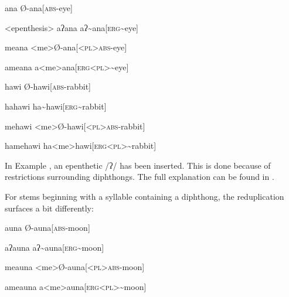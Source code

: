 \begin{paracol}{2}
\a
\begingl
\glpreamble ana
\endpreamble
Ø-ana[\textsc{abs-}eye]
\endgl
\switchcolumn

\a<epenthesis>
\begingl
\glpreamble aʔana
\endpreamble
aʔ\textasciitilde ana[\textsc{erg\textasciitilde }eye]
\endgl
\switchcolumn

\a
\begingl
\glpreamble meana
\endpreamble
<me>Ø-ana[\textsc{<pl>abs-}eye]
\endgl
\switchcolumn

\a
\begingl
\glpreamble ameana
\endpreamble
a<me>ana[\textsc{erg<pl>\textasciitilde}eye]
\endgl
\xe
\end{paracol}
\begin{paracol}{2}
\pex
\a
\begingl
\glpreamble hawi
\endpreamble
Ø-hawi[\textsc{abs-}rabbit]
\endgl
\switchcolumn

\a
\begingl
\glpreamble hahawi
\endpreamble
ha\textasciitilde hawi[\textsc{erg\textasciitilde }rabbit]
\endgl
\switchcolumn

\a
\begingl
\glpreamble mehawi
\endpreamble
<me>Ø-hawi[\textsc{<pl>abs-}rabbit]
\endgl
\switchcolumn

\a
\begingl
\glpreamble hamehawi
\endpreamble
ha<me>hawi[\textsc{erg<pl>\textasciitilde}rabbit]
\endgl
\xe
\end{paracol}

In Example , an epenthetic /ʔ/ has been inserted. This is done because of restrictions surrounding diphthongs. The full explanation can be found in .

For stems beginning with a syllable containing a diphthong, the reduplication surfaces a bit differently:

\begin{paracol}{2}
\pex
\a
\begingl
\glpreamble auna
\endpreamble
Ø-auna[\textsc{abs-}moon]
\endgl
\switchcolumn

\a
\begingl
\glpreamble aʔauna
\endpreamble
aʔ\textasciitilde auna[\textsc{erg\textasciitilde }moon]
\endgl
\switchcolumn

\a
\begingl
\glpreamble meauna
\endpreamble
<me>Ø-auna[\textsc{<pl>abs-}moon]
\endgl
\switchcolumn

\a
\begingl
\glpreamble ameauna
\endpreamble
a<me>auna[\textsc{erg<pl>\textasciitilde}moon]
\endgl
\xe

\end{paracol}

